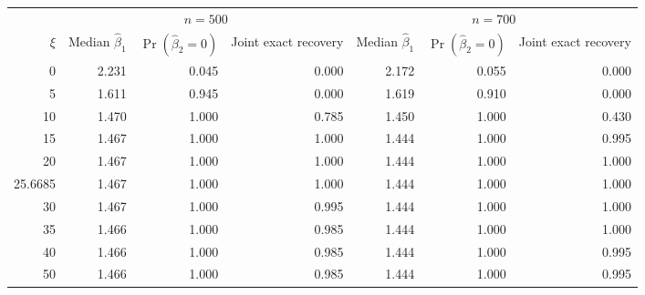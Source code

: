 \begin{table}[!htbp]
\centering

\label{tab:e11-xi-path}
\begin{threeparttable}
\small
\setlength{\tabcolsep}{4.0pt}
\begin{tabular}{rrrrrrr}
\toprule
& \multicolumn{3}{c}{\(n=500\)} & \multicolumn{3}{c}{\(n=700\)} \\
\cmidrule(lr){2-4}\cmidrule(lr){5-7}
\(\xi\) & Median \(\widehat\beta_1\) & \(\Pr(\widehat\beta_2=0)\) & Joint exact recovery & Median \(\widehat\beta_1\) & \(\Pr(\widehat\beta_2=0)\) & Joint exact recovery \\
\midrule
0 & 2.231 & 0.045 & 0.000 & 2.172 & 0.055 & 0.000 \\
5 & 1.611 & 0.945 & 0.000 & 1.619 & 0.910 & 0.000 \\
10 & 1.470 & 1.000 & 0.785 & 1.450 & 1.000 & 0.430 \\
15 & 1.467 & 1.000 & 1.000 & 1.444 & 1.000 & 0.995 \\
20 & 1.467 & 1.000 & 1.000 & 1.444 & 1.000 & 1.000 \\
25.6685 & 1.467 & 1.000 & 1.000 & 1.444 & 1.000 & 1.000 \\
30 & 1.467 & 1.000 & 0.995 & 1.444 & 1.000 & 1.000 \\
35 & 1.466 & 1.000 & 0.985 & 1.444 & 1.000 & 1.000 \\
40 & 1.466 & 1.000 & 0.985 & 1.444 & 1.000 & 0.995 \\
50 & 1.466 & 1.000 & 0.985 & 1.444 & 1.000 & 0.995 \\
\bottomrule
\end{tabular}
\end{threeparttable}
\end{table}

